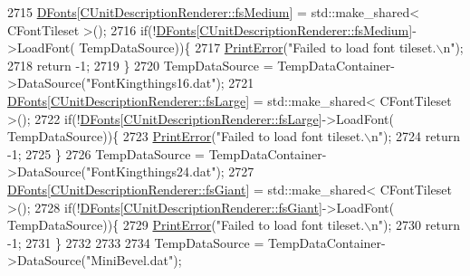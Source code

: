 \begin{DoxyCode}
2715     \hyperlink{classCApplicationData_afde9247d0a3ea87393ec86dcdb1e8274}{DFonts}[\hyperlink{classCUnitDescriptionRenderer_a3ea4cd83b6dd9533ab3abb953a7da35aa7b5aa12d8a01b317ebfbf1bd65d7e568}{CUnitDescriptionRenderer::fsMedium}] = std::make\_shared<
       CFontTileset >();
2716     \textcolor{keywordflow}{if}(!\hyperlink{classCApplicationData_afde9247d0a3ea87393ec86dcdb1e8274}{DFonts}[\hyperlink{classCUnitDescriptionRenderer_a3ea4cd83b6dd9533ab3abb953a7da35aa7b5aa12d8a01b317ebfbf1bd65d7e568}{CUnitDescriptionRenderer::fsMedium}]->LoadFont(
      TempDataSource))\{
2717         \hyperlink{Debug_8h_a2ed825eefefe35baf59a93a8c641323d}{PrintError}(\textcolor{stringliteral}{"Failed to load font tileset.\(\backslash\)n"});
2718         \textcolor{keywordflow}{return} -1;
2719     \}
2720     TempDataSource = TempDataContainer->DataSource(\textcolor{stringliteral}{"FontKingthings16.dat"});
2721     \hyperlink{classCApplicationData_afde9247d0a3ea87393ec86dcdb1e8274}{DFonts}[\hyperlink{classCUnitDescriptionRenderer_a3ea4cd83b6dd9533ab3abb953a7da35aaf467097fe4f4811a5e2f1959c86e071d}{CUnitDescriptionRenderer::fsLarge}] = std::make\_shared<
       CFontTileset >();
2722     \textcolor{keywordflow}{if}(!\hyperlink{classCApplicationData_afde9247d0a3ea87393ec86dcdb1e8274}{DFonts}[\hyperlink{classCUnitDescriptionRenderer_a3ea4cd83b6dd9533ab3abb953a7da35aaf467097fe4f4811a5e2f1959c86e071d}{CUnitDescriptionRenderer::fsLarge}]->LoadFont(
      TempDataSource))\{
2723         \hyperlink{Debug_8h_a2ed825eefefe35baf59a93a8c641323d}{PrintError}(\textcolor{stringliteral}{"Failed to load font tileset.\(\backslash\)n"});
2724         \textcolor{keywordflow}{return} -1;
2725     \}
2726     TempDataSource = TempDataContainer->DataSource(\textcolor{stringliteral}{"FontKingthings24.dat"});
2727     \hyperlink{classCApplicationData_afde9247d0a3ea87393ec86dcdb1e8274}{DFonts}[\hyperlink{classCUnitDescriptionRenderer_a3ea4cd83b6dd9533ab3abb953a7da35aa6194fc38e2cf8a4f891a90cbed5eafdd}{CUnitDescriptionRenderer::fsGiant}] = std::make\_shared<
       CFontTileset >();
2728     \textcolor{keywordflow}{if}(!\hyperlink{classCApplicationData_afde9247d0a3ea87393ec86dcdb1e8274}{DFonts}[\hyperlink{classCUnitDescriptionRenderer_a3ea4cd83b6dd9533ab3abb953a7da35aa6194fc38e2cf8a4f891a90cbed5eafdd}{CUnitDescriptionRenderer::fsGiant}]->LoadFont(
      TempDataSource))\{
2729         \hyperlink{Debug_8h_a2ed825eefefe35baf59a93a8c641323d}{PrintError}(\textcolor{stringliteral}{"Failed to load font tileset.\(\backslash\)n"});
2730         \textcolor{keywordflow}{return} -1;
2731     \}
2732     
2733     
2734     TempDataSource = TempDataContainer->DataSource(\textcolor{stringliteral}{"MiniBevel.dat"});

\end{DoxyCode}
